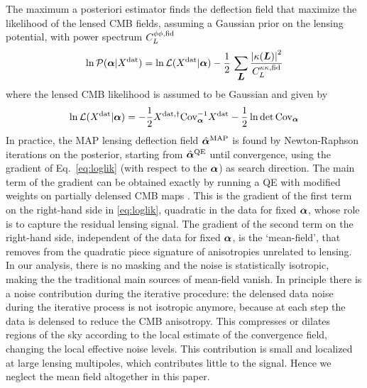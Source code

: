 \documentclass[prd, superscriptaddress, tightenlines, longbibliography, nofootinbib, eqsecnum, amsfonts, amsmath, floatfix, twocolumn, notitlepage]{revtex4-2}
\newcommand{\Cov}[0]{ {\rm{Cov}} }
\begin{document}
The maximum a posteriori estimator finds the deflection field that maximize the likelihood of the lensed CMB fields, assuming a Gaussian prior on the lensing potential, with power spectrum $C_L^{\phi\phi, \rm fid}$
\begin{equation}
    \ln \mathcal{P}({\boldsymbol{\alpha}} | X^{\rm dat}) = \ln \mathcal{L}( X^{\rm dat} | {\boldsymbol{\alpha}}) - \frac{1}{2} \, \sum_{\mbox{\boldmath{$L$}}} \frac{\left|\kappa({\mbox{\boldmath{$L$}}})\right|^2}{C_L^{\kappa\kappa, \rm fid}}
\end{equation}
where the lensed CMB likelihood is assumed to be Gaussian and given by 
\begin{equation}\label{eq:loglik}
    \ln \mathcal{L}( X^{\rm dat} | \valpha) = -\frac{1}{2} X^{\rm dat, \dagger }\Cov_\valpha^{-1} X^{\rm dat} - \frac{1}{2}\ln \det \Cov_\valpha
\end{equation}
In practice, the MAP lensing deflection field $\hat {{\boldsymbol{\alpha}}}^{\rm MAP}$ is found by Newton-Raphson iterations on the posterior, starting from $\hat {{\boldsymbol{\alpha}}}^{\rm QE}$ until convergence, using the gradient of Eq.~\eqref{eq:loglik} (with respect to the ${\boldsymbol{\alpha}}$) as search direction. The main term of the gradient can be obtained exactly by running a QE with modified weights on partially delensed CMB maps  \cite[see][for more details]{Carron:2017mqf}. This is the gradient of the first term on the right-hand side in \eqref{eq:loglik}, quadratic in the data for fixed ${\boldsymbol{\alpha}}$, whose role is to capture the residual lensing signal. The gradient of the second term on the right-hand side, independent of the data for fixed ${\boldsymbol{\alpha}}$, is the `mean-field', that removes from the quadratic piece signature of anisotropies unrelated to lensing. In our analysis, there is no masking and the noise is statistically isotropic, making the the traditional main sources of mean-field vanish. In principle there is a noise contribution during the iterative procedure: the delensed data noise during the iterative process is not isotropic anymore, because at each step the data is delensed to reduce the CMB anisotropy. This compresses or dilates regions of the sky according to the local estimate of the convergence field, changing the local effective noise levels. This contribution is small and localized at large lensing multipoles, which contributes little to the signal. Hence we neglect the mean field altogether in this paper. 
\end{document}

